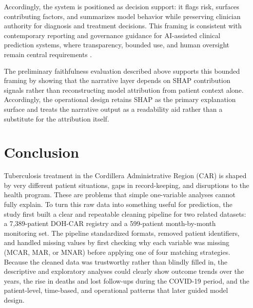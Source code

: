 \documentclass[12pt]{article}
\begin{document}
Accordingly, the system is positioned as decision support: it flags risk, surfaces contributing factors, and summarizes model behavior while preserving clinician authority for diagnosis and treatment decisions. This framing is consistent with contemporary reporting and governance guidance for AI-assisted clinical prediction systems, where transparency, bounded use, and human oversight remain central requirements \citep{ref44}.

The preliminary faithfulness evaluation described above supports this bounded framing by showing that the narrative layer depends on SHAP contribution signals rather than reconstructing model attribution from patient context alone. Accordingly, the operational design retains SHAP as the primary explanation surface and treats the narrative output as a readability aid rather than a substitute for the attribution itself.


\section{Conclusion}

Tuberculosis treatment in the Cordillera Administrative Region (CAR) is shaped by very different patient situations, gaps in record-keeping, and disruptions to the health program. These are problems that simple one-variable analyses cannot fully explain. To turn this raw data into something useful for prediction, the study first built a clear and repeatable cleaning pipeline for two related datasets: a 7{,}389-patient DOH-CAR registry and a 599-patient month-by-month monitoring set. The pipeline standardized formats, removed patient identifiers, and handled missing values by first checking why each variable was missing (MCAR, MAR, or MNAR) before applying one of four matching strategies. Because the cleaned data was trustworthy rather than blindly filled in, the descriptive and exploratory analyses could clearly show outcome trends over the years, the rise in deaths and lost follow-ups during the COVID-19 period, and the patient-level, time-based, and operational patterns that later guided model design.
\end{document}
